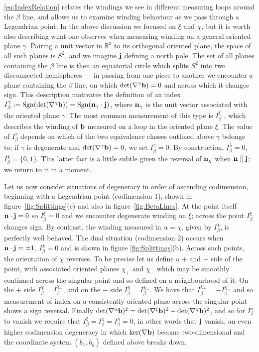 { \eqref{eq:IndexRelation} relates the windings we see in different measuring loops around the $\beta$ line, and allows us to examine winding behaviour as we pass through a Legendrian point. In the above discussion we focused on $\xi$ and $\chi$, but it is worth also describing what one observes when measuring winding on a general oriented plane $\gamma$. Pairing a unit vector in $\mathbb{R}^3$ to its orthogonal oriented plane, the space of all such planes is $S^2$, and we imagine $\mathbf{j} $ defining a north pole. The set of all planes containing the $\beta$ line is then an equatorial circle which splits $S^2$ into two disconnected hemispheres --- in passing from one piece to another we encounter a plane containing the $\beta$ line, on which $\mathrm{det}(\nabla^\gamma \mathbf{b}) = 0$ and across which it changes sign. This description motivates the definition of an index $ I^\gamma_\beta := \mathrm{Sgn}(\mathrm{det}(\nabla^\gamma \mathbf{b})) =\mathrm{Sgn}(\mathbf{n}_\gamma \cdot \mathbf{j})$, where $\mathbf{n}_\gamma$ is the unit vector associated with the oriented plane $\gamma$. The most common measurement of this type is $I^\xi_\beta$ \citep{Nye1987,Berry1998,Berry2004}, which describes the winding of $\mathbf{b}$ measured on a loop in the oriented plane $\xi$. The value of $I^\gamma_\beta$ depends on which of the two equivalence classes outlined above $\gamma$ belongs to; if $\gamma$ is degenerate and $\mathrm{det}(\nabla^\gamma \mathbf{b})=0$, we set $I^\gamma_\beta=0$. By construction, $I^\lambda_\beta=0$, $I^\chi_\beta= \{0,1\}$. This latter fact is a little subtle given the reversal of $\mathbf{n}_\chi$ when $\mathbf{n} \parallel \mathbf{j}$; we return to it in a moment.  

 Let us now consider situations of degeneracy in order of ascending codimension, beginning with a Legendrian point (codimension $1$), shown in figure~\ref{fig:Splittings}(c) and also in figure~\ref{fig:BetaLines}. At the point itself $\mathbf{n} \cdot \mathbf{j} =0$ so $I^\xi_\beta=0$ and we encounter degenerate winding on $\xi$; across the point $I^\xi_\beta$ changes sign. By contrast, the winding measured in $\alpha = \chi$, given by $I^{\chi}_\beta$, is perfectly well behaved. The dual situation (codimension $2$) occurs when $\mathbf{n} \cdot \mathbf{j} = \pm 1$, $I^\chi_\beta=0$ and is shown in figure \ref{fig:Splittings}(b). Across such points, the orientation of $\chi$ reverses. To be precise let us define a $+$ and $-$ side of the point, with associated oriented planes $\chi_+$ and $\chi_-$ which may be smoothly continued across the singular point and so defined on a neighbourhood of it. On the $+$ side $I^\chi_\beta = I_\beta^{\chi_+}$, and on the $-$ side $I_{\beta}^\chi = I_{\beta}^{\chi_-}$. We have that $I_{\beta}^{\chi_+} = -I_{\beta}^{\chi_-}$ and so measurement of index on a consistently oriented plane across the singular point shows a sign reversal. Finally $\mathrm{det}(\nabla^{\alpha}\mathbf{b})^2 = \mathrm{det}(\nabla^\xi \mathbf{b})^2+ \mathrm{det}(\nabla^\chi \mathbf{b})^2$, and so for $I^{\mathrm{\alpha}}_\beta$ to vanish we require that $I^\xi_\beta = I^\chi_\beta = I^\lambda_\beta=0$, in other words that $\mathbf{j}$ vanish, an even higher codimension degeneracy in which $\mathrm{ker}(\nabla \mathbf{b})$ become two-dimensional and the coordinate system $(b_x,b_y)$ defined above breaks down. 

}

